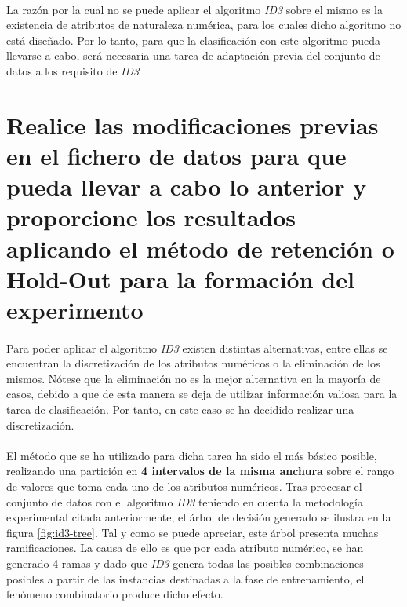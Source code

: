 \documentclass[10pt, a4paper,spanish]{article}
\begin{document}
		\paragraph{}
		La razón por la cual no se puede aplicar el algoritmo \emph{ID3} sobre el mismo es la existencia de atributos de naturaleza numérica, para los cuales dicho algoritmo no está diseñado. Por lo tanto, para que la clasificación con este algoritmo pueda llevarse a cabo, será necesaria una tarea de adaptación previa del conjunto de datos a los requisito de \emph{ID3}

	\section{Realice las modificaciones previas en el fichero de datos para que pueda llevar a cabo lo anterior y proporcione los resultados aplicando el método de retención o Hold-Out para la formación del experimento}

		\paragraph{}
		Para poder aplicar el algoritmo \emph{ID3} existen distintas alternativas, entre ellas se encuentran la discretización de los atributos numéricos o la eliminación de los mismos. Nótese que la eliminación no es la mejor alternativa en la mayoría de casos, debido a que de esta manera se deja de utilizar información valiosa para la tarea de clasificación. Por tanto, en este caso se ha decidido realizar una discretización.

		\paragraph{}
		El método que se ha utilizado para dicha tarea ha sido el más básico posible, realizando una partición en \textbf{4 intervalos de la misma anchura} sobre el rango de valores que toma cada uno de los atributos numéricos. Tras procesar el conjunto de datos con el algoritmo \emph{ID3} teniendo en cuenta la metodología experimental citada anteriormente, el árbol de decisión generado se ilustra en la figura \ref{fig:id3-tree}. Tal y como se puede apreciar, este árbol presenta muchas ramificaciones. La causa de ello es que por cada atributo numérico, se han generado 4 ramas y dado que \emph{ID3} genera todas las posibles combinaciones posibles a partir de las instancias destinadas a la fase de entrenamiento, el fenómeno combinatorio produce dicho efecto.
\end{document}
